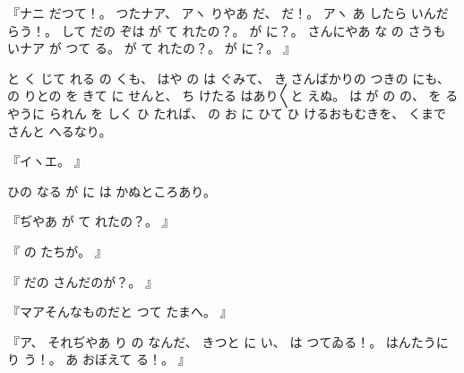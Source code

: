 『ナニ
だつて！。
%
つたナア、
%
アヽ
りやあ
だ、
%
だ！。
%
アヽ
あ
したら
いんだらう！。
%
して
だの
ぞは
が
て
れたの？。
%
が
に？。
%
さんにやあ
な
の
さうも
いナア
が
つて
る。
%
が
て
れたの？。
%
が
に？。
』

と
く
じて
れる
の
くも、
%
はや
の
は
ぐみて、
%
き
さんばかりの
つきの
にも、
%
の
りとの
を
きて
に
せんと、
%
ち
けたる
はあり〳〵と
えぬ。
%
は
が
の
の、
%
を
るやうに
られん
を
しく
ひ
たれば、
%
の
お
に
ひて
ひ
けるおもむきを、
%
くまで
さんと
へるなり。

『イヽエ。
』

ひの
なる
が
に
は
かぬところあり。

『ぢやあ
が
て
れたの？。
』

『
の
たちが。
』

『
だの
さんだのが？。
』

『マアそんなものだと
つて
たまへ。
』

『ア、
%
それぢやあ
り
の
なんだ、
%
きつと
に
い、
%
は
つてゐる！。
%
はんたうに
り
う！。
%
あ
おぼえて
る！。
』

